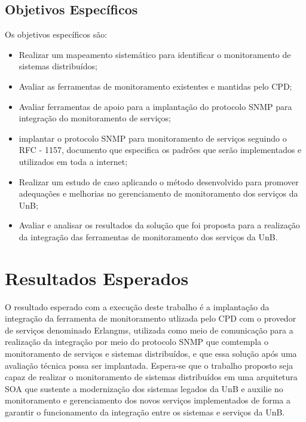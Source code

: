 \subsection{Objetivos Específicos}
\label{objetivos_especificos}

Os objetivos específicos são:

\begin{itemize}
	 
\item Realizar um mapeamento sistemático para identificar o monitoramento
de sistemas distribuídos;

\item Avaliar as ferramentas de monitoramento existentes e mantidas pelo \acrshort{CPD};

\item Avaliar ferramentas de apoio para a implantação do protocolo \acrshort{SNMP} para integração do monitoramento de serviços;

\item implantar o protocolo \acrshort{SNMP} para monitoramento de serviços seguindo o RFC - 1157\cite{Schoffstall}, documento que especifica os padrões que serão implementados e utilizados em toda a internet;

\item Realizar um estudo de caso aplicando o método desenvolvido para promover adequações e melhorias no gerenciamento de monitoramento dos serviços da \acrshort{UnB}; 

\item Avaliar e analisar os resultados da solução que foi proposta para a realização da integração das ferramentas de monitoramento dos serviços da \acrshort{UnB}. 

\end{itemize}


\section{Resultados Esperados}

O resultado esperado com a execução deste trabalho é a implantação da integração da ferramenta de monitoramento utlizada pelo \acrshort{CPD} com o provedor de serviços denominado Erlangms\cite{Agilar}, utilizada como meio de comunicação para a realização da integração por meio do protocolo \acrshort{SNMP} que comtempla o monitoramento de serviços e sistemas distribuídos, e que essa solução após uma avaliação técnica possa ser implantada. Espera-se que o trabalho proposto seja capaz de realizar o monitoramento de sistemas distribuídos em uma arquitetura \acrshort{SOA} que sustente a modernização dos sistemas legados da \acrshort{UnB} e auxilie no monitoramento e gerenciamento dos novos serviços implementados de forma a garantir o funcionamento da integração entre os sistemas e serviços da \acrshort{UnB}.

